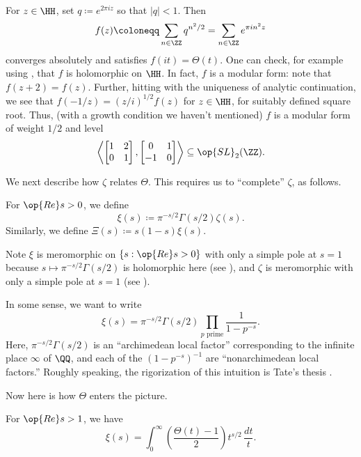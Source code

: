 \documentclass[../notes.tex]{subfiles}
\begin{document}
\begin{remark}
	For $z\in\HH$, set $q\coloneqq e^{2\pi iz}$ so that $|q|<1$. Then
	\[f(z)\coloneqq\sum_{n\in\ZZ}q^{n^2/2}=\sum_{n\in\ZZ}e^{\pi in^2z}\]
	converges absolutely and satisfies $f(it)=\Theta(t)$. One can check, for example using , that $f$ is holomorphic on $\HH$. In fact, $f$ is a modular form: note that $f(z+2)=f(z)$. Further, hitting  with the uniqueness of analytic continuation, we see that $f(-1/z)=(z/i)^{1/2}f(z)$ for $z\in\HH$, for suitably defined square root. Thus, (with a growth condition we haven't mentioned) $f$ is a modular form of weight $1/2$ and level
	\[\left\langle\begin{bmatrix}
		1 & 2 \\
		0 & 1
	\end{bmatrix},\begin{bmatrix}
		0 & 1 \\
		-1 & 0
	\end{bmatrix}\right\rangle\subseteq\op{SL}_2(\ZZ).\]
\end{remark}
We next describe how $\zeta$ relates $\Theta$. This requires us to ``complete'' $\zeta$, as follows.
\begin{defihelper}[{$\xi$}] 
	For $\op{Re}s>0$, we define
	\[\xi(s)\coloneqq\pi^{-s/2}\Gamma(s/2)\zeta(s).\]
	Similarly, we define $\Xi(s)\coloneqq s(1-s)\xi(s)$.
\end{defihelper}
\begin{remark}
	Note $\xi$ is meromorphic on $\{s:\op{Re}s>0\}$ with only a simple pole at $s=1$ because $s\mapsto\pi^{-s/2}\Gamma(s/2)$ is holomorphic here (see ), and $\zeta$ is meromorphic with only a simple pole at $s=1$ (see ).
\end{remark}
\begin{remark}
	In some sense, we want to write
	\[\xi(s)=\pi^{-s/2}\Gamma(s/2)\prod_{p\text{ prime}}\frac1{1-p^{-s}}.\]
	Here, $\pi^{-s/2}\Gamma(s/2)$ is an ``archimedean local factor'' corresponding to the infinite place $\infty$ of $\QQ$, and each of the $\left(1-p^{-s}\right)^{-1}$ are ``nonarchimedean local factors.'' Roughly speaking, the rigorization of this intuition is Tate's thesis \cite{tate-thesis}.
\end{remark}
Now here is how $\Theta$ enters the picture.
\begin{lemma} \label{lem:xi-as-integral}
	For $\op{Re}s>1$, we have
	\[\xi(s)=\int_0^\infty\left(\frac{\Theta(t)-1}2\right)t^{s/2}\,\frac{dt}t.\]
\end{lemma}
\end{document}
